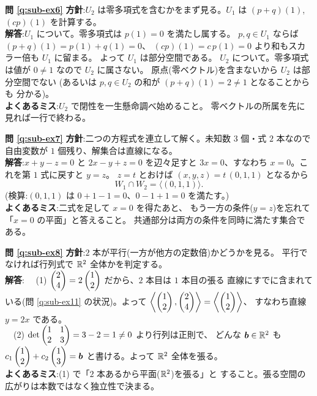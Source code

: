 \bigskip
\noindent\textbf{問 \ref{q:sub-ex6}}\quad
\textbf{方針}:$U_2$ は零多項式を含むかをまず見る。$U_1$ は
$(p + q)(1)$, $(cp)(1)$ を計算する。\\
\textbf{解答}:$U_1$ について。零多項式は $p(1) = 0$ を満たし属する。
$p, q \in U_1$ ならば $(p + q)(1) = p(1) + q(1) = 0$、
$(cp)(1) = c\,p(1) = 0$ より和もスカラー倍も $U_1$ に留まる。
よって $U_1$ は部分空間である。
$U_2$ について。零多項式は値が $0 \neq 1$ なので $U_2$ に属さない。
原点(零ベクトル)を含まないから $U_2$ は部分空間でない
(あるいは $p, q \in U_2$ の和が $(p+q)(1) = 2 \neq 1$ となることからも
分かる)。\\
\textbf{よくあるミス}:$U_2$ で閉性を一生懸命調べ始めること。
零ベクトルの所属を先に見れば一行で終わる。

\bigskip
\noindent\textbf{問 \ref{q:sub-ex7}}\quad
\textbf{方針}:二つの方程式を連立して解く。未知数 $3$ 個・式 $2$ 本なので
自由変数が $1$ 個残り、解集合は直線になる。\\
\textbf{解答}:$x + y - z = 0$ と $2x - y + z = 0$ を辺々足すと
$3x = 0$、すなわち $x = 0$。これを第 $1$ 式に戻すと $y = z$。
$z = t$ とおけば $(x, y, z) = t\,(0, 1, 1)$ となるから
\[
W_1 \cap W_2 = \langle (0, 1, 1) \rangle.
\]
(検算:$(0, 1, 1)$ は $0 + 1 - 1 = 0$、$0 - 1 + 1 = 0$ を満たす。)\\
\textbf{よくあるミス}:二式を足して $x = 0$ を得たあと、
もう一方の条件($y = z$)を忘れて「$x = 0$ の平面」と答えること。
共通部分は両方の条件を同時に満たす集合である。

\bigskip
\noindent\textbf{問 \ref{q:sub-ex8}}\quad
\textbf{方針}:$2$ 本が平行(一方が他方の定数倍)かどうかを見る。
平行でなければ行列式で $\mathbb{R}^2$ 全体かを判定する。\\
\textbf{解答}:
　(1) $\begin{pmatrix}2 \\ 4\end{pmatrix} = 2\begin{pmatrix}1 \\ 2\end{pmatrix}$ だから、$2$ 本目は $1$ 本目の張る
直線にすでに含まれている(問 \ref{q:sub-ex11} の状況)。よって
$\left\langle \begin{pmatrix}1 \\ 2\end{pmatrix}, \begin{pmatrix}2 \\ 4\end{pmatrix} \right\rangle
= \left\langle \begin{pmatrix}1 \\ 2\end{pmatrix} \right\rangle$、
すなわち直線 $y = 2x$ である。\\
　(2) $\det \begin{pmatrix}1 & 1 \\ 2 & 3\end{pmatrix} = 3 - 2 = 1 \neq 0$ より行列は正則で、
どんな $\bm{b} \in \mathbb{R}^2$ も $c_1\begin{pmatrix}1 \\ 2\end{pmatrix} + c_2\begin{pmatrix}1 \\ 3\end{pmatrix} = \bm{b}$
と書ける。よって $\mathbb{R}^2$ 全体を張る。\\
\textbf{よくあるミス}:(1) で「$2$ 本あるから平面($\mathbb{R}^2$)を張る」と
すること。張る空間の広がりは本数ではなく独立性で決まる。

